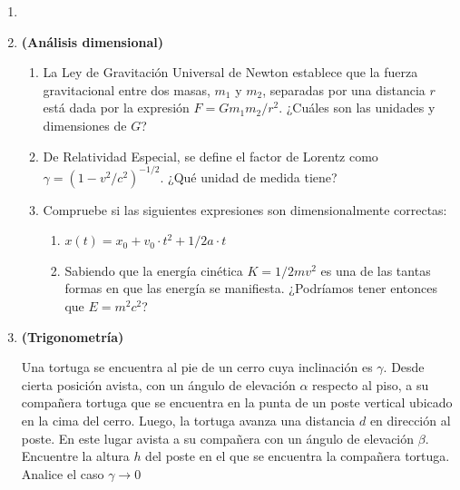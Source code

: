 \documentclass[letterpaper,11pt]{article}
\begin{document}
\vspace{-1cm}
\begin{enumerate}\setlength{\itemsep}{0.4cm}\addtocounter{enumi}{-1}


\item[]


\item \textbf{(Análisis dimensional)} 
    \begin{enumerate}
        \item La Ley de Gravitación Universal de Newton establece que la fuerza gravitacional entre dos masas, $m_1$ y $m_2$, separadas por una distancia $r$ está dada por la expresión $F = Gm_1m_2 / r^2$. ¿Cuáles son las unidades y dimensiones de $G$?
        
        \item De Relatividad Especial, se define el factor de Lorentz como $\gamma = (1-v^2/c^2)^{-1/2}$. ¿Qué unidad de medida tiene? 
        
        \item Compruebe si las siguientes expresiones son dimensionalmente correctas:
            \begin{enumerate}
                \item $x(t) = x_0 + v_0\cdot t^2 + 1/2 a \cdot t$
                
                \item Sabiendo que la energía cinética $K = 1/2 m v^2$ es una de las tantas formas en que las energía se manifiesta. ¿Podríamos tener entonces que $E=m^2 c^2$?
            \end{enumerate}
    \end{enumerate}

\item \textbf{(Trigonometría)}
\begin{multicols}{2}
    Una tortuga se encuentra al pie de un cerro cuya inclinación es $\gamma$. Desde cierta posición avista, con un ángulo de elevación $\alpha$ respecto al piso, a su compañera tortuga que se encuentra en la punta de un poste vertical ubicado en la cima del cerro. Luego, la tortuga avanza una distancia $d$ en dirección al poste. En este lugar avista a su compañera con un ángulo de elevación $\beta$. Encuentre la altura $h$ del poste en el que se encuentra la compañera tortuga. Analice el caso $\gamma\rightarrow 0$
    
    \columnbreak
    
    \begin{figure}[H]
        \centering
        
    \end{figure}


\end{multicols}
\end{enumerate}
\end{document}
